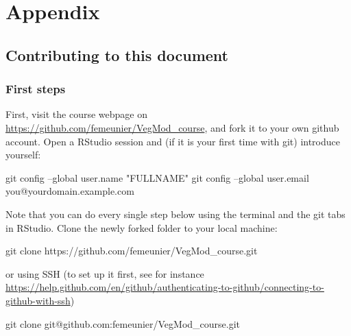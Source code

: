 \documentclass[oneside]{book}
\newenvironment{Shaded}{\begin{snugshade}}{\end{snugshade}}
\newcommand{\StringTok}[1]{\textcolor[rgb]{0.31,0.60,0.02}{#1}}
\newcommand{\FunctionTok}[1]{\textcolor[rgb]{0.00,0.00,0.00}{#1}}
\newcommand{\NormalTok}[1]{#1}
\begin{document}
\part{Appendix}\label{part-appendix}

\chapter*{Contributing to this
document}\label{contributing-to-this-document}

\section*{First steps}\label{first-steps}

First, visit the course webpage on
\url{https://github.com/femeunier/VegMod_course}, and fork it to your
own github account. Open a RStudio session and (if it is your first time
with git) introduce yourself:

\begin{Shaded}
\begin{Highlighting}[]
\FunctionTok{git}\NormalTok{ config --global user.name }\StringTok{"FULLNAME"}
\FunctionTok{git}\NormalTok{ config --global user.email you@yourdomain.example.com}
\end{Highlighting}
\end{Shaded}

Note that you can do every single step below using the terminal and the
git tabs in RStudio. Clone the newly forked folder to your local
machine:

\begin{Shaded}
\begin{Highlighting}[]
\FunctionTok{git}\NormalTok{ clone https://github.com/femeunier/VegMod_course.git}
\end{Highlighting}
\end{Shaded}

or using SSH (to set up it first, see for instance
\url{https://help.github.com/en/github/authenticating-to-github/connecting-to-github-with-ssh})

\begin{Shaded}
\begin{Highlighting}[]
\FunctionTok{git}\NormalTok{ clone git@github.com:femeunier/VegMod_course.git}
\end{Highlighting}
\end{Shaded}
\end{document}
